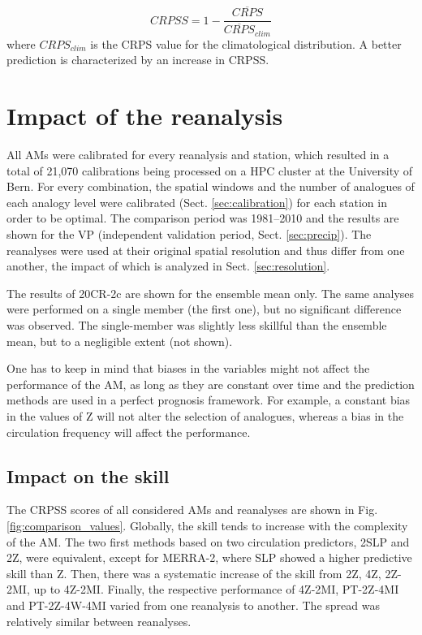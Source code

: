 \documentclass[smallextended]{svjour3}       %
\begin{document}
	\begin{equation}
	\label{eq:CRPSS}
	CRPSS = 1-\frac{\overline{CRPS}}{\overline{CRPS}_{clim}}
	\end{equation}
	where $CRPS_{clim}$ is the CRPS value for the climatological distribution. A better prediction is characterized by an increase in CRPSS.
	
	
	\section{Impact of the reanalysis}
	\label{sec:influence}
	
	All AMs were calibrated for every reanalysis and station, which resulted in a total of 21,070 calibrations being processed on a HPC cluster at the University of Bern. For every combination, the spatial windows and the number of analogues of each analogy level were calibrated (Sect. \ref{sec:calibration}) for each station in order to be optimal. The comparison period was 1981--2010 and the results are shown for the VP (independent validation period, Sect. \ref{sec:precip}). The reanalyses were used at their original spatial resolution and thus differ from one another, the impact of which is analyzed in Sect. \ref{sec:resolution}.
	
	The results of 20CR-2c are shown for the ensemble mean only. The same analyses were performed on a single member (the first one), but no significant difference was observed. The single-member was slightly less skillful than the ensemble mean, but to a negligible extent (not shown).
	
	One has to keep in mind that biases in the variables might not affect the performance of the AM, as long as they are constant over time and the prediction methods are used in a perfect prognosis framework. For example, a constant bias in the values of Z will not alter the selection of analogues, whereas a bias in the circulation frequency will affect the performance.
	
	
	\subsection{Impact on the skill}
	
	The CRPSS scores of all considered AMs and reanalyses are shown in Fig. \ref{fig:comparison_values}. Globally, the skill tends to increase with the complexity of the AM. The two first methods based on two circulation predictors, 2SLP and 2Z, were equivalent, except for MERRA-2, where SLP showed a higher predictive skill than Z. Then, there was a systematic increase of the skill from 2Z, 4Z, 2Z-2MI, up to 4Z-2MI. Finally, the respective performance of 4Z-2MI, PT-2Z-4MI and PT-2Z-4W-4MI varied from one reanalysis to another. The spread was relatively similar between reanalyses.
	
\end{document}
